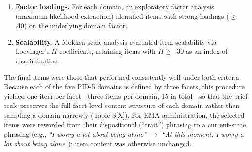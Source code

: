 \documentclass[
  english,
  man,floatsintext]{apa6}
\begin{document}
\begin{enumerate}
\def\labelenumi{\arabic{enumi}.}
\item
  \textbf{Factor loadings.} For each domain, an exploratory factor analysis (maximum-likelihood extraction) identified items with strong loadings (\(\geq\) .40) on the underlying domain factor.
\item
  \textbf{Scalability.} A Mokken scale analysis evaluated item scalability via Loevinger's \(H\) coefficients, retaining items with \(H \geq\) .30 as an index of discrimination.
\end{enumerate}

The final items were those that performed consistently well under both criteria. Because each of the five PID-5 domains is defined by three facets, this procedure yielded one item per facet---three items per domain, 15 in total---so that the brief scale preserves the full facet-level content structure of each domain rather than sampling a domain narrowly (Table S{[}X{]}). For EMA administration, the selected items were reworded from their dispositional (``trait'') phrasing to a current-state phrasing (e.g., \emph{``I worry a lot about being alone''} \(\rightarrow\) \emph{``At this moment, I worry a lot about being alone''}); item content was otherwise unchanged.
\end{document}
